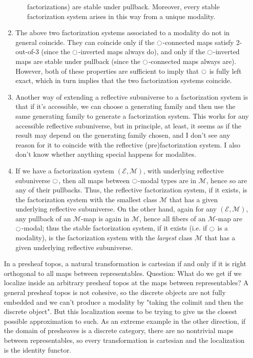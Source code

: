 \documentclass[9pt,twosided]{amsart}
\begin{document}
\begin{enumerate}
\begin{enumerate}
factorizations) are stable under pullback.  Moreover, every stable
factorization system arises in this way from a unique modality.
\end{enumerate}
\item The above two factorization systems associated to a modality do not
in general coincide.  They can coincide only if the ${\ocircle}$-connected maps
satisfy 2-out-of-3 (since the ${\ocircle}$-inverted maps always do), and only if
the ${\ocircle}$-inverted maps are stable under pullback (since the ${\ocircle}$-connected
maps always are).  However, both of these properties are sufficient
to imply that ${\ocircle}$ is fully left exact, which in turn implies that the
two factorization systems coincide.
\item Another way of extending a reflective subuniverse to a
factorization system is that if it's accessible, we can choose a
generating family and then use the same generating family to generate
a factorization system.  This works for any accessible reflective
subuniverse, but in principle, at least, it seems as if the result may
depend on the generating family chosen, and I don't see any reason for
it to coincide with the reflective (pre)factorization system.  I also
don't know whether anything special happens for modalites.
\item If we have a factorization system $(\mathcal{E},\mathcal{M})$,
with underlying reflective subuniverse ${\ocircle}$, then all maps between
${\ocircle}$-modal types are in $\mathcal{M}$, hence so are any of their pullbacks.  Thus,
the reflective factorization system, if it exists, is the
factorization system with the smallest class $\mathcal{M}$ that has a given
underlying reflective subuniverse.  On the other hand, again for any
$(\mathcal{E},\mathcal{M})$, any pullback of an $\mathcal{M}$-map is again in $\mathcal{M}$, hence all fibers of an
$\mathcal{M}$-map are ${\ocircle}$-modal; thus the stable factorization system, if it exists
(i.e. if ${\ocircle}$ is a modality), is the factorization system with the
\emph{largest} class $\mathcal{M}$ that has a given underlying reflective subuniverse.
\end{enumerate}

In a presheaf topos, a natural transformation is cartesian if and only if it is right orthogonal to all maps between representables. 
Question: What do we get if we localize inside an
arbitrary presheaf topos at the maps between representables?  A
general presheaf topos is not cohesive, so the discrete objects are
not fully embedded and we can't produce a modality by "taking the
colimit and then the discrete object".  But this localization seems to
be trying to give us the closest possible approximation to such.  As
an extreme example in the other direction, if the domain of presheaves
is a discrete category, there are no nontrivial maps between
representables, so every transformation is cartesian and the
localization is the identity functor.
\end{document}
